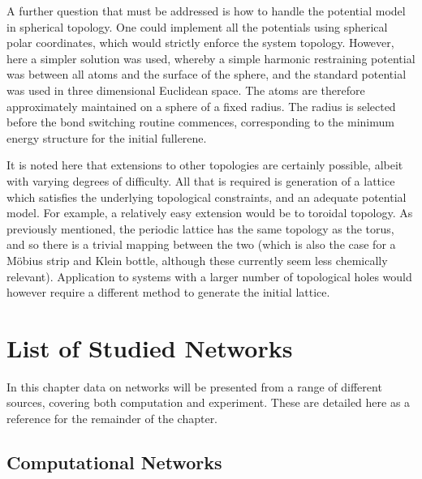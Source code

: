 A further question that must be addressed is how to handle the potential model in spherical topology. 
One could implement all the potentials using spherical polar coordinates, which would strictly enforce the system topology.
However, here a simpler solution was used, whereby a simple harmonic restraining potential was between all atoms and the surface of the sphere, and the standard potential was used in three dimensional Euclidean space.
The atoms are therefore approximately maintained on a sphere of a fixed radius.
The radius is selected before the bond switching routine commences, corresponding to the minimum energy structure for the initial fullerene.

It is noted here that extensions to other topologies are certainly possible, albeit with varying degrees of difficulty.
All that is required is generation of a lattice which satisfies the underlying topological constraints, and an adequate potential model.
For example, a relatively easy extension would be to toroidal topology.
As previously mentioned, the periodic \td{} lattice has the same topology as the torus, and so there is a trivial mapping between the two (which is also the case for a M\"obius strip and Klein bottle, although these currently seem less chemically relevant).
Application to systems with a larger number of topological holes would however require a different method to generate the initial lattice. 

\section{List of Studied Networks}

In this chapter data on networks will be presented from a range of different sources, covering both computation and experiment.
These are detailed here as a reference for the remainder of the chapter.

\subsection{Computational Networks}
\label{s:gennetcompsamples}

